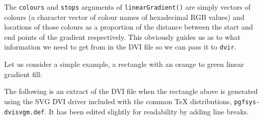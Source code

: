 \documentclass[]{article}
\begin{document}
The \texttt{colours} and \texttt{stops} arguments of
\texttt{linearGradient()} are simply vectors of colours (a character
vector of colour names of hexadecimal RGB values) and locations of those
colours as a proportion of the distance between the start and end points
of the gradient respectively. This obviously guides us as to what
information we need to get from \Tikz{} in the DVI file so we can pass
it to \texttt{dvir}.

Let us consider a simple example, a rectangle with an orange to green
linear gradient fill:

\begin{figure}
\end{figure}

The following is an extract of the DVI file when the rectangle above is
generated using the SVG DVI driver included with the common \TeX{}
distributions, \texttt{pgfsys-dvisvgm.def}. It has been edited slightly
for readability by adding line breaks.
\end{document}
